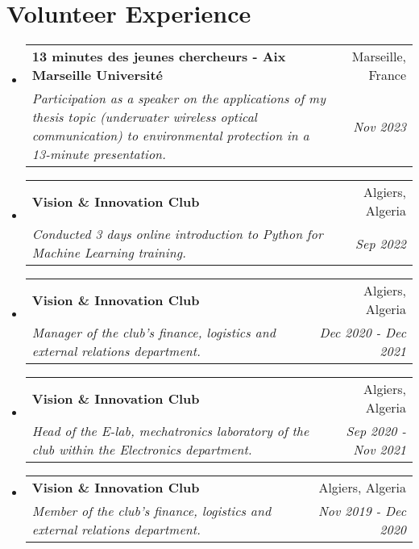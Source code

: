 \documentclass[a4paper,20pt]{article}
\makeatletter
\newcommand{\resumeSubheading}[4]{
  \vspace{-1pt}\item
    \begin{tabular*}{0.97\textwidth}{l@{\extracolsep{\fill}}r}
      \textbf{#1} & #2 \\
      \textit{#3} & \textit{#4} \\
    \end{tabular*}\vspace{-5pt}
}
\newcommand{\resumeSubHeadingListStart}{\begin{itemize}[leftmargin=*]}
\newcommand{\resumeSubHeadingListEnd}{\end{itemize}}
\makeatother
\begin{document}
\vspace{-5pt}
\section{Volunteer Experience}
  \resumeSubHeadingListStart
    \resumeSubheading
    {13 minutes des jeunes chercheurs - Aix Marseille Université}{Marseille, France}
    {Participation as a speaker on the applications of my thesis topic (underwater wireless optical communication) to environmental protection in a 13-minute presentation. }{Nov 2023}
    \vspace{5pt}
	  \resumeSubheading
    {Vision \& Innovation Club}{Algiers, Algeria}
    {Conducted 3 days online introduction to Python for Machine Learning training.}{Sep 2022}
    \vspace{5pt}
    \resumeSubheading
    {Vision \& Innovation Club}{Algiers, Algeria}
    {Manager of the club's finance, logistics and external relations department.}{Dec 2020 - Dec 2021}
    \vspace{5pt}
    \resumeSubheading
    {Vision \& Innovation Club}{Algiers, Algeria}
    {Head of the E-lab, mechatronics laboratory of the club within the Electronics department.}{Sep 2020 - Nov 2021}
    \vspace{5pt}
    \resumeSubheading
        {Vision \& Innovation Club}{Algiers, Algeria}
        {Member of the club's finance, logistics and external relations department.}{Nov 2019 - Dec 2020}

  \resumeSubHeadingListEnd

\vspace{-5pt}
\end{document}
